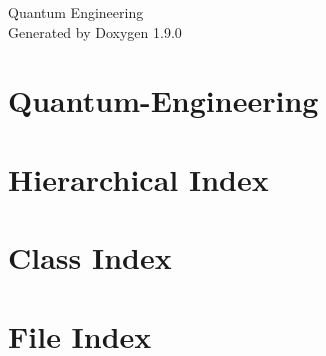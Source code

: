 \let\mypdfximage\pdfximage\def\pdfximage{\immediate\mypdfximage}\documentclass[twoside]{book}
\newcommand{\+}{\discretionary{\mbox{\scriptsize$\hookleftarrow$}}{}{}}
\newcommand{\clearemptydoublepage}{%
  \newpage{\pagestyle{empty}\cleardoublepage}%
}
\begin{document}
\hypersetup{pageanchor=false,
             bookmarksnumbered=true,
             pdfencoding=unicode
            }
\begin{titlepage}
\vspace*{7cm}
\begin{center}%
{\Large Quantum Engineering }\\
\vspace*{1cm}
{\large Generated by Doxygen 1.9.0}\\
\end{center}
\end{titlepage}
\clearemptydoublepage
{}
\tableofcontents
\clearemptydoublepage
{}
\hypersetup{pageanchor=true}

\chapter{Quantum-\/\+Engineering}
\label{md_README}

\chapter{Hierarchical Index}

\chapter{Class Index}

\chapter{File Index}

\end{document}
